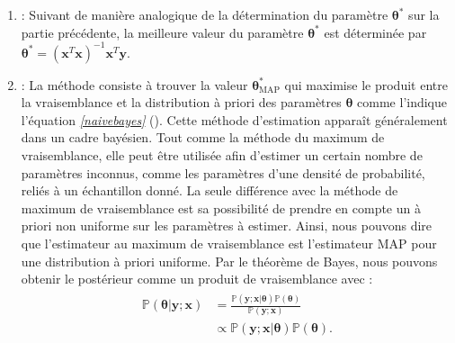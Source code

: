 \documentclass[letterpaper,11pt,english]{sphinxmanual}
\begin{document}
\begin{enumerate}
%
\item {} 
\sphinxAtStartPar
{}: Suivant de manière analogique de la
détermination du paramètre \(\boldsymbol{\theta}^*\) sur la
partie précédente, la meilleure valeur du paramètre
\(\boldsymbol{\theta}^{*}\) est déterminée par
\(\boldsymbol{\theta}^*= (\mathbf{x}^T \mathbf{x})^{-1}\mathbf{x}^T\mathbf{y}.\)

\item {} 
\sphinxAtStartPar
{}: La méthode consiste à trouver la valeur
\(\boldsymbol{\theta}^{*}_{\mathrm{MAP}}\) qui maximise le
produit entre la vraisemblance et la distribution à priori des
paramètres \(\boldsymbol{\theta}\) comme l’indique l’équation
{\hyperref[\detokenize{chapter3:naivebayes}]{\emph{{[}naivebayes{]}}}} (). Cette méthode d’estimation apparaît
généralement dans un cadre bayésien. Tout comme la méthode du maximum
de vraisemblance, elle peut être utilisée afin d’estimer un certain
nombre de paramètres inconnus, comme les paramètres d’une densité de
probabilité, reliés à un échantillon donné. La seule différence avec
la méthode de maximum de vraisemblance est sa possibilité de prendre
en compte un à priori non uniforme sur les paramètres à estimer.
Ainsi, nous pouvons dire que l’estimateur au maximum de vraisemblance
est l’estimateur MAP pour une distribution à priori uniforme. Par le
théorème de Bayes, nous pouvons obtenir le postérieur comme un
produit de vraisemblance avec :
\begin{equation}\label{equation:chapter3:chapter3:16}
\begin{split}\begin{aligned}
        \mathbb{P}\left(\boldsymbol{\theta}|\mathbf{y};\mathbf{x} \right) &= \frac{\mathbb{P}\left(\mathbf{y};\mathbf{x}|\boldsymbol{\theta}\right) \mathbb{P}\left(\boldsymbol{\theta} \right)}{\mathbb{P}\left(\mathbf{y};\mathbf{x}\right)}
        \\
        & \propto \mathbb{P}\left(\mathbf{y};\mathbf{x}|\boldsymbol{\theta}\right)\mathbb{P}\left(\boldsymbol{\theta}\right).\nonumber
    \end{aligned}\end{split}
\end{equation}
\end{enumerate}
\end{document}
